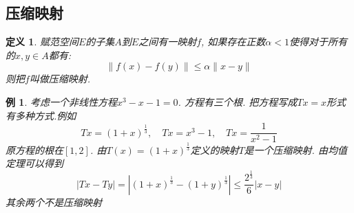 \documentclass{book}
\newtheorem{definition}{\hspace{2em}定义}[section]
\newtheorem{example}{例}[section]
\begin{document}
\subsection*{压缩映射}
\begin{definition}
  赋范空间$E$的子集$A$到$E$之间有一映射$f$, 如果存在正数$\alpha<1$使得对于所有的$x,y\in A$都有:
  \begin{equation*}
    \|f(x)-f(y)\|\leq\alpha\|x-y\|
  \end{equation*}
  则把$f$叫做压缩映射.
\end{definition}
\begin{example}
  考虑一个非线性方程$x^3-x-1=0$. 方程有三个根. 把方程写成$Tx=x$形式有多种方式.例如
  \begin{equation*}
    Tx=(1+x)^{\frac{1}{3}},\quad Tx=x^3-1,\quad Tx=\frac{1}{x^2-1}
  \end{equation*}
  原方程的根在$[1,2]$. 由$T(x)=(1+x)^{\frac{1}{3}}$定义的映射$T$是一个压缩映射. 由均值定理可以得到
  \begin{equation*}
    |Tx-Ty|=|(1+x)^{\frac{1}{3}}-(1+y)^{\frac{1}{3}}|\leq\frac{2^{\frac{1}{3}}}{6}|x-y|
  \end{equation*}
  其余两个不是压缩映射
\end{example}
\end{document}
